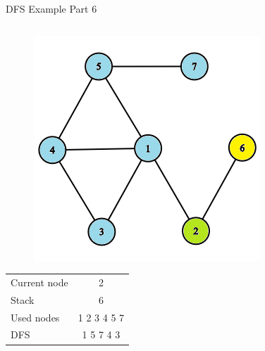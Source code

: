 \documentclass[aspectratio=169]{beamer}%
\begin{document}
\begin{frame}{DFS Example Part 6}
\begin{columns}
\begin{column}{0.32\textwidth}
\begin{figure}[!ht]
                \centering
                \includegraphics[width=0.9\linewidth]{dfs 18.png}
            \end{figure}
            \begin{table}[ht]
                \centering
                \begin{tabular}{l c}
                    Current node & 2\\
                    Stack & 6\\ 
                    Used nodes & 1 2 3 4 5 7\\
                    DFS & 1 5 7 4 3 
                \end{tabular}
            \end{table}
        \end{column}
    \end{columns}
\end{frame}
\end{document}
